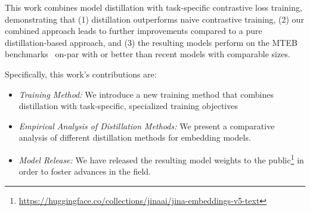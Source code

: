 \documentclass[11pt]{article}
\begin{document}
This work combines model distillation with task-specific contrastive loss training, demonstrating that (1) distillation outperforms naive contrastive training, (2) our combined approach leads to further improvements compared to a pure distillation-based approach, and (3) the resulting models perform  on the MTEB benchmarks~\cite{enevoldsenmmteb} on-par with or better than recent models with comparable sizes.

Specifically, this work's contributions are:
\begin{itemize}
    \item \emph{Training Method:} We introduce a new training method that combines distillation with task-specific, specialized training objectives
    \item \emph{Empirical Analysis of Distillation Methods:} We present a comparative analysis of different distillation methods for embedding models. 
    \item \emph{Model Release:} We have released the resulting model weights to the public\footnote{\url{https://huggingface.co/collections/jinaai/jina-embeddings-v5-text}} in order to foster advances in the field.
\end{itemize}


\end{document}
